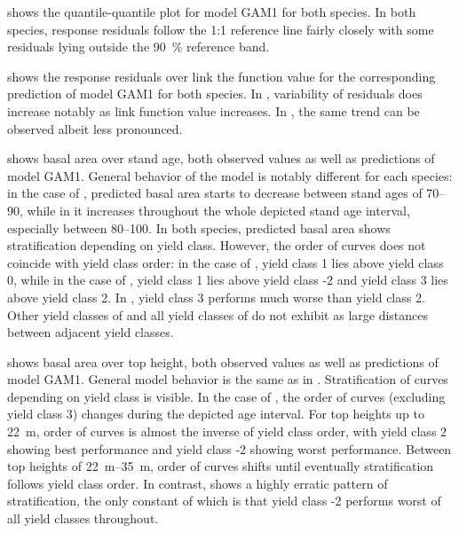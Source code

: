  shows the quantile-quantile plot for model GAM1 for both species.  In both species, response residuals follow the 1:1 reference line fairly closely with some residuals lying outside the \SI{90}{\percent} reference band.

 shows the response residuals over link the function value for the corresponding prediction of model GAM1 for both species.  In \Beech{}, variability of residuals does increase notably as link function value increases.  In \Spruce{}, the same trend can be observed albeit less pronounced.

 shows basal area over stand age, both observed values as well as predictions of model GAM1.  General behavior of the model is notably different for each species:  in the case of \Beech{}, predicted basal area starts to decrease between stand ages of \SIrange{70}{90}{\year}, while in \Spruce{} it increases throughout the whole depicted stand age interval, especially between \SIrange{80}{100}{\year}.  In both species, predicted basal area shows stratification depending on yield class.  However, the order of curves does not coincide with yield class order:  in the case of \Beech{}, yield class 1 lies above yield class 0, while in the case of \Spruce{}, yield class 1 lies above yield class -2 and yield class 3 lies above yield class 2.  In \Beech{}, yield class 3 performs much worse than yield class 2.  Other yield classes of \Beech{} and all yield classes of \Spruce{} do not exhibit as large distances between adjacent yield classes. 

 shows basal area over top height, both observed values as well as predictions of model GAM1.  General model behavior is the same as in .  Stratification of curves depending on yield class is visible.  In the case of \Beech{}, the order of curves (excluding yield class 3) changes during the depicted age interval.  For top heights up to \SI{22}{\meter}, order of curves is almost the inverse of yield class order, with yield class 2 showing best performance and yield class -2 showing worst performance.  Between top heights of \SIrange{22}{35}{\meter}, order of curves shifts until eventually stratification follows yield class order.  In contrast, \Spruce{} shows a highly erratic pattern of stratification, the only constant of which is that yield class -2 performs worst of all yield classes throughout.

